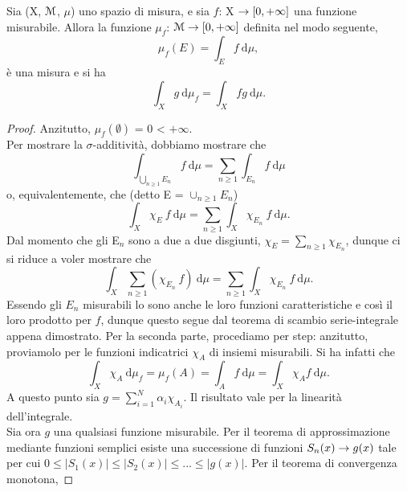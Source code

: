 \documentclass[Completo.tex]{subfiles}
\begin{document}
	\begin{eTh}
		Sia (X, $\eu[M]$, $\mu$) uno spazio di misura, e sia $f$: X $\rightarrow [0, +\infty]$ una funzione misurabile. Allora la funzione $\mu_f$: $\eu[M] \ra [0, +\infty]$ definita nel modo seguente,
		\begin{equation*}
		\mu_f(E) = \int_E f \ \mathrm{d}\mu,
		\end{equation*}
		è una misura e si ha
		\begin{equation*}
		\int_X g \ \mathrm{d}\mu_f = \int_X fg \ \mathrm{d}\mu.
		\end{equation*}
	\end{eTh}
	\begin{proof}
		Anzitutto, $\mu_f(\emptyset)$ = 0 < $+\infty$. \\
		Per mostrare la $\sigma$-additività, dobbiamo mostrare che
		\begin{equation*}
		\int_{\bigcup\limits_{n\geq1}E_n} f \ \mathrm{d}\mu = \sum_{n\geq 1} \int_{E_n} f \ \mathrm{d}\mu
		\end{equation*}
		o, equivalentemente, che (detto E = $\cup_{n\geq1}E_n$)
		\begin{equation*}
		\int_X \chi_E \ f \ \mathrm{d}\mu = \sum_{n\geq 1} \int_X \chi_{E_n} \ f \ \mathrm{d}\mu.
		\end{equation*}
		Dal momento che gli E$_n$ sono a due a due disgiunti, $\chi_E = \sum_{n\geq 1} \chi_{E_n}$, dunque ci si riduce a voler mostrare che
		\begin{equation*}
		\int_X \sum_{n\geq 1}(\chi_{E_n} \ f) \ \mathrm{d}\mu = \sum_{n\geq 1} \int_X \chi_{E_n} \ f \ \mathrm{d}\mu.
		\end{equation*}
		Essendo gli $E_n$ misurabili lo sono anche le loro funzioni caratteristiche e così il loro prodotto per $f$, dunque questo segue dal teorema di scambio serie-integrale appena dimostrato. Per la seconda parte, procediamo per step: anzitutto, proviamolo per le funzioni indicatrici $\chi_A$ di insiemi misurabili. Si ha infatti che
		\begin{equation*}
		\int_X \chi_A \ \mathrm{d}\mu_f = \mu_f(A) = \int_A f \ \mathrm{d}\mu = \int_X \chi_A f \ \mathrm{d}\mu.
		\end{equation*}
		A questo punto sia $g = \sum_{i=1}^{N} \alpha_i \chi_{A_i}$. Il risultato vale per la linearità dell'integrale. \\
		Sia ora $g$ una qualsiasi funzione misurabile. Per il teorema di approssimazione mediante funzioni semplici esiste una successione di funzioni $S_n(x) \rightarrow g(x)$ tale per cui $0 \leq \vert S_1(x) \vert \leq \vert S_2(x) \vert \leq ... \leq \vert g(x) \vert$. Per il teorema di convergenza monotona,

\end{proof}
\end{document}
